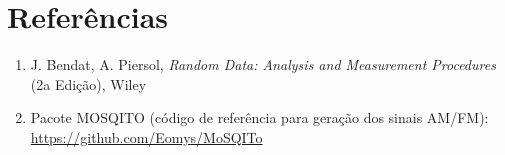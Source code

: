\documentclass[a4paper,twoside,12pt]{article}
\begin{document}
	
	\section*{Referências}
	
	\begin{enumerate}
		\item J. Bendat, A. Piersol, \emph{Random Data: Analysis and Measurement Procedures} (2a Edição), Wiley
		\item Pacote MOSQITO (código de referência para geração dos sinais AM/FM): \url{https://github.com/Eomys/MoSQITo}
	\end{enumerate}
	
\end{document}
